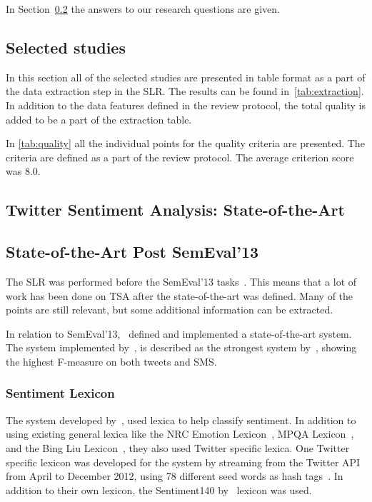 In Section~\ref{sec:stateofart} the answers to our research questions are given. 

\subsection{Selected studies}
\label{sec:selected}

In this section all of the selected studies are presented in table format as a part of the data extraction step in the SLR. The results can be found in~\autoref{tab:extraction}. In addition to the data features defined in the review protocol, the total quality is added to be a part of the extraction table.



In \autoref{tab:quality} all the individual points for the quality criteria are presented. The criteria are defined as a part of the review protocol. The average criterion score was 8.0.



\subsection{Twitter Sentiment Analysis: State-of-the-Art}
\label{sec:stateofart}


\subsection{State-of-the-Art Post SemEval'13}

The SLR was performed before the SemEval'13 tasks~\citep{WilsonEA:13}. This means that a lot of work has been done on TSA after the state-of-the-art was defined. Many of the points are still relevant, but some additional information can be extracted. 

In relation to SemEval'13,~\cite{MohammadEA:13} defined and implemented a state-of-the-art system. The system implemented by~\cite{MohammadEA:13}, is described as the strongest system by~\cite{WilsonEA:13}, showing the highest F-measure on both tweets and SMS.

\subsubsection{Sentiment Lexicon}

The system developed by~\cite{MohammadEA:13}, used lexica to help classify sentiment. In addition to using existing general lexica like the NRC Emotion Lexicon~\citep{mohammad2010emotions, mohammad2011tracking}, MPQA Lexicon~\citep{wilson2005recognizing}, and the Bing Liu Lexicon~\citep{hu2004mining}, they also used Twitter specific lexica. One Twitter specific lexicon was developed for the system by streaming from the Twitter API from April to December 2012, using 78 different seed words as hash tags~\citep{MohammadEA:13}. In addition to their own lexicon, the Sentiment140 by~\cite{article:go} lexicon was used.

